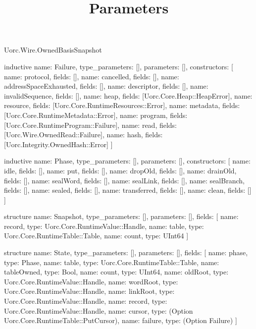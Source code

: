 \begin{lexlean}{Uorc.Wire.OwnedBasisSnapshot}
\title{Parameters}
\begin{semanticmodule}
inductive{
  name: Failure,
  type_parameters: [],
  parameters: [],
  constructors: [
    {name: protocol, fields: []},
    {name: cancelled, fields: []},
    {name: addressSpaceExhausted, fields: []},
    {name: descriptor, fields: []},
    {name: invalidSequence, fields: []},
    {name: heap, fields: [Uorc.Core.Heap::HeapError]},
    {name: resource, fields: [Uorc.Core.RuntimeResources::Error]},
    {name: metadata, fields: [Uorc.Core.RuntimeMetadata::Error]},
    {name: program, fields: [Uorc.Core.RuntimeProgram::Failure]},
    {name: read, fields: [Uorc.Wire.OwnedRead::Failure]},
    {name: hash, fields: [Uorc.Integrity.OwnedHash::Error]}
  ]
}

inductive{
  name: Phase,
  type_parameters: [],
  parameters: [],
  constructors: [
    {name: idle, fields: []},
    {name: put, fields: []},
    {name: dropOld, fields: []},
    {name: drainOld, fields: []},
    {name: sealWord, fields: []},
    {name: sealLink, fields: []},
    {name: sealBranch, fields: []},
    {name: sealed, fields: []},
    {name: transferred, fields: []},
    {name: clean, fields: []}
  ]
}

structure{
  name: Snapshot,
  type_parameters: [],
  parameters: [],
  fields: [
    {name: record, type: Uorc.Core.RuntimeValue::Handle},
    {name: table, type: Uorc.Core.RuntimeTable::Table},
    {name: count, type: UInt64}
  ]
}

structure{
  name: State,
  type_parameters: [],
  parameters: [],
  fields: [
    {name: phase, type: Phase},
    {name: table, type: Uorc.Core.RuntimeTable::Table},
    {name: tableOwned, type: Bool},
    {name: count, type: UInt64},
    {name: oldRoot, type: Uorc.Core.RuntimeValue::Handle},
    {name: wordRoot, type: Uorc.Core.RuntimeValue::Handle},
    {name: linkRoot, type: Uorc.Core.RuntimeValue::Handle},
    {name: record, type: Uorc.Core.RuntimeValue::Handle},
    {name: cursor, type: (Option Uorc.Core.RuntimeTable::PutCursor)},
    {name: failure, type: (Option Failure)}
  ]
}


\end{semanticmodule}
\end{lexlean}
